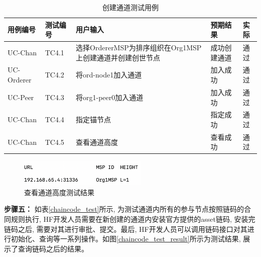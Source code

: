 {\footnotesize
\begin{longtable}[h]{m{45pt} m{45pt} m{180pt} m{50pt} m{20pt}}
    \caption[创建通道测试用例]{创建通道测试用例} \label{channel_test}\\
        \hline  
        用例编号&测试编号&用户输入&预期结果&实际\\
        \hline
        UC-Chan & TC4.1 & 选择OrdererMSP为排序组织在Org1MSP上创建通道并创建创世节点 & 成功创建通道 & 通过 \\
        \hline
        UC-Orderer & TC4.2 & 将ord-node1加入通道 & 加入成功 & 通过 \\
        \hline
        UC-Peer & TC4.3 & 将org1-peer0加入通道 & 加入成功 & 通过 \\
        \hline
        UC-Chan & TC4.4 & 指定锚节点 & 指定成功 & 通过 \\
        \hline
        UC-Chan & TC4.5 & 查看通道高度 & 查看成功 & 通过 \\
        \hline
    \end{longtable} 
}

\begin{figure}[h] %
    \centering %
    \includegraphics[width=0.55\textwidth]{FIGs/chapter5/channel.png} %
    \caption{查看通道高度测试结果} %
    \label{channel_test_result} %
\end{figure}%

\textbf{步骤五：} 如表\ref{chaincode_test}所示, 为测试通道内所有的参与节点按照链码的合同规则执行, HF开发人员需要在新创建的通道内安装官方提供的asset\footnotemark[1]链码, 安装完链码之后, 需要对其进行审批、提交。最后, HF开发人员可以调用链码接口对其进行初始化、查询等一系列操作。如图\ref{chaincode_test_result}所示为测试结果, 展示了查询链码之后的结果。

